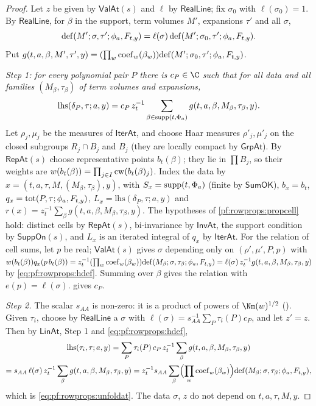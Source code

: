\begin{proof}
Let $z$ be given by $\mathsf{ValAt}(s)$ and $\ell$ by $\mathsf{RealLine}$; fix $\sigma_0$ with $\ell(\sigma_0)=1$. By
$\mathsf{RealLine}$, for $\beta$ in the support, term volumes $M'$, expansions $\tau'$ and all $\sigma$,
\begin{equation}\label{eq:pf:rowprops:hdef}
\mathrm{def}(M';\sigma,\tau';\phi_a,F_{t,y})=\ell(\sigma)\,\mathrm{def}(M';\sigma_0,\tau';\phi_a,F_{t,y}).
\end{equation}
Put $g(t,a,\beta,M',\tau',y)=(\prod_w\mathrm{coef}_w(\beta_w))\mathrm{def}(M';\sigma_0,\tau';\phi_a,F_{t,y})$.

\emph{Step 1: for every polynomial pair $P$ there is $c_P\in\C$ such that for all data and all families $(M_\beta,\tau_\beta)$
of term volumes and expansions,}
\[
\mathrm{lhs}(\delta_P,\tau;a,y)=c_P\,z_t^{-1}\sum_{\beta\in\mathrm{supp}(t,\Phi_a)}g(t,a,\beta,M_\beta,\tau_\beta,y).
\]
Let $\rho_j,\mu_j$ be the measures of $\mathsf{IterAt}$, and choose Haar measures $\rho'_j,\mu'_j$ on the closed subgroups
$R_j\cap B_j$ and $B_j$ (they are locally compact by $\mathsf{GrpAt}$). By $\mathsf{RepAt}(s)$ choose representative points
$b_t(\beta)$; they lie in $\prod B_j$, so their weights are $w(b_t(\beta))=\prod_{j\in I}\mathrm{cw}(b_t(\beta)_j)$. Index the data by
$x=(t,a,\tau,M,(M_\beta,\tau_\beta),y)$, with $S_x=\mathrm{supp}(t,\Phi_a)$ (finite by $\mathsf{SumOK}$), $b_x=b_t$,
$q_x=\mathrm{tot}(P,\tau;\phi_a,F_{t,y})$, $L_x=\mathrm{lhs}(\delta_P,\tau;a,y)$ and $r(x)=z_t^{-1}\sum_\beta
g(t,a,\beta,M_\beta,\tau_\beta,y)$. The hypotheses of \cref{pf:rowprops:propcell} hold: distinct cells by $\mathsf{RepAt}(s)$,
bi-invariance by $\mathsf{InvAt}$, the support condition by $\mathsf{SuppOn}(s)$, and $L_x$ is an iterated integral of $q_x$
by $\mathsf{IterAt}$. For the relation of cell sums, let $p$ be real; $\mathsf{ValAt}(s)$ gives $\sigma$ depending only on
$(\rho',\mu',P,p)$ with $w(b_t(\beta))q_x(p\,b_t(\beta))=z_t^{-1}(\prod_w\mathrm{coef}_w(\beta_w))\mathrm{def}(M_\beta;\sigma,\tau_\beta;\phi_a,F_{t,y})
=\ell(\sigma)\,z_t^{-1}g(t,a,\beta,M_\beta,\tau_\beta,y)$ by \eqref{eq:pf:rowprops:hdef}. Summing over $\beta$ gives the relation with
$e(p)=\ell(\sigma)$.  gives $c_P$.

\emph{Step 2.} The scalar $s_{AA}$ is non-zero: it is a product of powers of $\Nm(w)^{1/2}$
(). Given $\tau_i$, choose by $\mathsf{RealLine}$ a $\sigma$ with
$\ell(\sigma)=s_{AA}^{-1}\sum_P\tau_i(P)c_P$, and let $z'=z$. Then by $\mathsf{LinAt}$, Step 1 and \eqref{eq:pf:rowprops:hdef},
\begin{multline*}
\mathrm{lhs}(\tau_i,\tau;a,y)=\sum_P\tau_i(P)\,c_P\,z_t^{-1}\sum_\beta g(t,a,\beta,M_\beta,\tau_\beta,y)\\
=s_{AA}\,\ell(\sigma)\,z_t^{-1}\sum_\beta g(t,a,\beta,M_\beta,\tau_\beta,y)
=z_t^{-1}s_{AA}\sum_\beta\Bigl(\prod_w\mathrm{coef}_w(\beta_w)\Bigr)\mathrm{def}(M_\beta;\sigma,\tau_\beta;\phi_a,F_{t,y}),
\end{multline*}
which is \eqref{eq:pf:rowprops:unfoldat}. The data $\sigma$, $z$ do not depend on $t,a,\tau,M,y$.
\end{proof}

